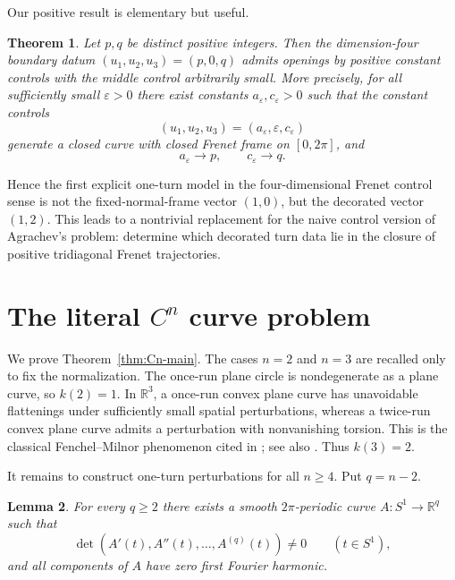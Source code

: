 \documentclass[11pt,reqno]{amsart}
\newtheorem{theorem}{Theorem}[section]
\newtheorem{lemma}[theorem]{Lemma}
\theoremstyle{definition}
\theoremstyle{remark}
\newcommand{\R}{\mathbb R}
\newcommand{\eps}{\varepsilon}
\begin{document}
\medskip
Our positive result is elementary but useful.

\begin{theorem}\label{thm:opening-intro}
Let $p,q$ be distinct positive integers.  Then the dimension-four boundary datum
$(u_1,u_2,u_3)=(p,0,q)$ admits openings by positive constant controls with the middle control arbitrarily small.
More precisely, for all sufficiently small $\eps>0$ there exist constants
$a_\eps,c_\eps>0$ such that the constant controls
\[
        (u_1,u_2,u_3)=(a_\eps,\eps,c_\eps)
\]
generate a closed curve with closed Frenet frame on $[0,2\pi]$, and
\[
        a_\eps\to p,
        \qquad
        c_\eps\to q .
\]
\end{theorem}

Hence the first explicit one-turn model in the four-dimensional Frenet control sense
is not the fixed-normal-frame vector $(1,0)$, but the decorated vector $(1,2)$.  This
leads to a nontrivial replacement for the naive control version of Agrachev's problem:
determine which decorated turn data lie in the closure of positive tridiagonal Frenet
trajectories.

\section{\texorpdfstring{The literal $C^n$ curve problem}{The literal Cn curve problem}}

We prove Theorem~\ref{thm:Cn-main}.  The cases $n=2$ and $n=3$ are recalled only
to fix the normalization.  The once-run plane circle is nondegenerate as a plane
curve, so $k(2)=1$.  In $\R^3$, a once-run convex plane curve has unavoidable
flattenings under sufficiently small spatial perturbations, whereas a twice-run
convex plane curve admits a perturbation with nonvanishing torsion.  This is the
classical Fenchel--Milnor phenomenon cited in \cite[Sec.~VI]{Agrachev}; see also
\cite{Fenchel,Milnor}.  Thus $k(3)=2$.

It remains to construct one-turn perturbations for all $n\ge4$.  Put $q=n-2$.

\begin{lemma}\label{lem:auxiliary-curve}
For every $q\ge2$ there exists a smooth $2\pi$-periodic curve $A:S^1\to\R^q$ such
that
\begin{equation}\label{eq:auxiliary-wronskian}
        \det(A'(t),A''(t),\ldots,A^{(q)}(t))\ne0
        \qquad(t\in S^1),
\end{equation}
and all components of $A$ have zero first Fourier harmonic.
\end{lemma}
\end{document}
